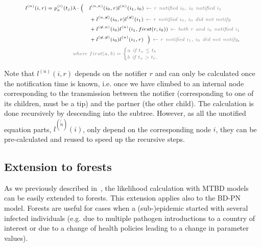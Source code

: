\documentclass[a4paper,10pt]{article}
\begin{document}
\begin{equation}
\scriptsize
\begin{split}
l^{(n)}(i, r) = p_o^{(i)}(t_j) \lambda \cdot
\Big(~~~&l^{(n,n)}(i_0,r)l^{(n)}(i_1,i_0) \textit{\color{gray}~$\leftarrow$ $r$ notified $i_0$, $i_0$  notified $i_1$} \\
& + l^{(n,\not{n})}(i_0,r)l^{(\not{n})}(i_1) \textit{\color{gray}~$\leftarrow$  $r$ notified $i_0$, $i_0$ did not notify} \\
& +l^{(\not{n}, n)}(i_0)l^{(n)}(i_1,first(r,i_0)) \textit{\color{gray}~$\leftarrow$ both $r$ and $i_0$ notified $i_1$} \\
& + l^{(\not{n},\not{n})}(i_0)l^{(n)}(i_1,r)~~\Big) \textit{\color{gray}~$\leftarrow$ $r$ notified $i_1$, $i_0$ did not notify}, \\
\textit{\color{gray}~where } &\color{gray}first(a,b) = 
\begin{cases}
a \textit{~if $t_a \leq t_b$}\\
b \textit{~if $t_a > t_b$.}
\end{cases} 
 \end{split}
\label{eq:lp-tip-int}
\end{equation}


Note that $l^{(n)}(i, r)$ depends on the notifier $r$ and can only be calculated once the notification time is known, i.e. once we have climbed to an internal node corresponding to the transmission between the notifier (corresponding to one of its children, must be a tip) and the partner (the other child). The calculation is done recursively by descending into the subtree. However, as all the unotified equation parts, $l^{(\not{n})}(i)$, only depend on the corresponding node $i$, they can be pre-calculated and reused to speed up the recursive steps.



\bigskip





\subsection{Extension to forests}

As we previously described in~\citep{zhukovaFastAccurateMaximumLikelihood2022}, the likelihood calculation with MTBD models can be easily extended to forests. This extension applies also to the BD-PN model. Forests are useful for cases when a (sub-)epidemic started with several infected individuals (e.g. due to multiple pathogen introductions to a country of interest or due to a change of health policies leading to a change in parameter values).
\end{document}
